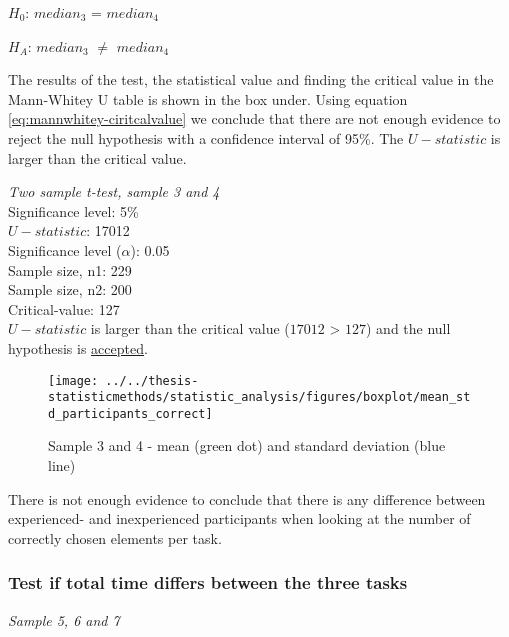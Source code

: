 \centerline{$H_{0}$: $median_3$ = $median_4$}
\centerline{$H_{A}$: $median_3$ $\neq$ $median_4$}

The results of the test, the statistical value and finding the critical value in the Mann-Whitey U table is shown in the box under. Using equation \ref{eq:mannwhitey-ciritcalvalue} we conclude that there are not enough evidence to reject the null hypothesis with a confidence interval of 95\%. The $U-statistic$ is larger than the critical value. 

 \begin{center}
	\begin{tcolorbox}[width=0.8\textwidth]
		\centering
		\textit{Two sample t-test, sample 3 and 4}\\
		Significance level: 5\%  \\[0.5cm]
		
		$U-statistic$: 17012 \\
		Significance level ($\alpha$): 0.05 \\
		Sample size, n1:  229\\
		Sample size, n2: 200\\
		Critical-value: 127 \\[0.2cm] %
		
		$U-statistic$ is larger than the critical value ($17012$ > $127$) and the null hypothesis is \underline{accepted}.\\[0.5cm]
	\end{tcolorbox} 
\end{center}

\begin{figure}[H]
	\centering
	\texttt{[image: ../../thesis-statisticmethods/statistic\_analysis/figures/boxplot/mean\_std\_participants\_correct]}
	\caption{Sample 3 and 4 - mean (green dot) and standard deviation (blue line)}
	\label{fig:meanstdparticipantscorrect}
\end{figure}

There is not enough evidence to conclude that there is any difference between experienced- and inexperienced participants when looking at the number of correctly chosen elements per task. 

\subsubsection[Sample 5, 6 and 7]{Test if total time differs between the three tasks}\label{sec:anova_result} %
\textit{Sample 5, 6 and 7}\newline

